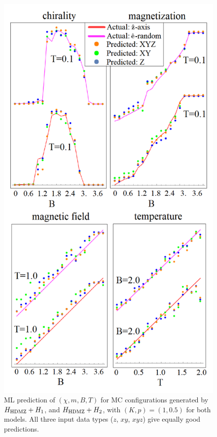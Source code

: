 \documentclass[reprint,amsmath,amssymb,aps,showpacs,superscriptaddress,prl]{revtex4-1}
\begin{document}
\begin{figure}[t]
\includegraphics[scale=0.36]{fig4.png}
\caption{ML prediction of $(\chi, m, B, T)$ for MC configurations generated by $H_{\rm HDMZ}+ H_1$, and $H_{\rm HDMZ} + H_2$, with $(K,p)=(1, 0.5)$ for both models.  All three input data types ($z$, $xy$, $xyz$) give equally good predictions.} \label{fig:4}
\end{figure}
\end{document}

